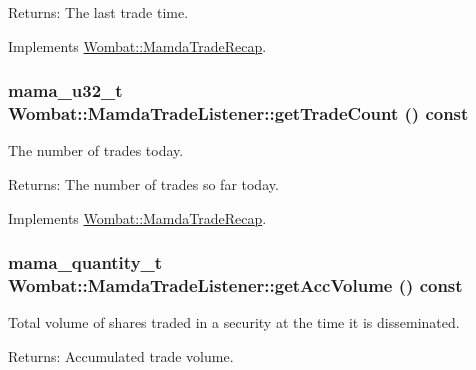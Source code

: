 \begin{Desc}
\item[Returns:]The last trade time. \end{Desc}


Implements \hyperlink{classWombat_1_1MamdaTradeRecap_c613c40f5f339c6c7508000c92cda65c}{Wombat::Mamda\-Trade\-Recap}.\hypertarget{classWombat_1_1MamdaTradeListener_09698082a48276bf7d67a160bdff61b7}{
\subsubsection[getTradeCount]{\setlength{\rightskip}{0pt plus 5cm}mama\_\-u32\_\-t Wombat::Mamda\-Trade\-Listener::get\-Trade\-Count () const}}
\label{classWombat_1_1MamdaTradeListener_09698082a48276bf7d67a160bdff61b7}


The number of trades today. 

\begin{Desc}
\item[Returns:]The number of trades so far today. \end{Desc}


Implements \hyperlink{classWombat_1_1MamdaTradeRecap_16854299d7b7266d833c7d8ce405baf2}{Wombat::Mamda\-Trade\-Recap}.\hypertarget{classWombat_1_1MamdaTradeListener_7636476d5939f0128bf0a7fba1960cd6}{
\subsubsection[getAccVolume]{\setlength{\rightskip}{0pt plus 5cm}mama\_\-quantity\_\-t Wombat::Mamda\-Trade\-Listener::get\-Acc\-Volume () const}}
\label{classWombat_1_1MamdaTradeListener_7636476d5939f0128bf0a7fba1960cd6}


Total volume of shares traded in a security at the time it is disseminated. 

\begin{Desc}
\item[Returns:]Accumulated trade volume. \end{Desc}


